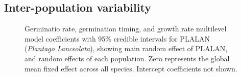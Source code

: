 \documentclass[12pt]{article}\usepackage[]{graphicx}\usepackage[]{color}
\begin{document}
\subsection{Inter-population variability}
\pagebreak
\begin{figure}[H]
\centering
{}
\caption{Germinatio rate, germination timing, and growth rate multilevel model coefficients with 95\% credible intervals for PLALAN (\textit{Plantago Lanceolata}), showing main random effect of PLALAN, and random effects of each population. Zero represents the global mean fixed effect across all species. Intercept coefficients not shown.}
\label{fig:pops}
\end{figure}
\end{document}
